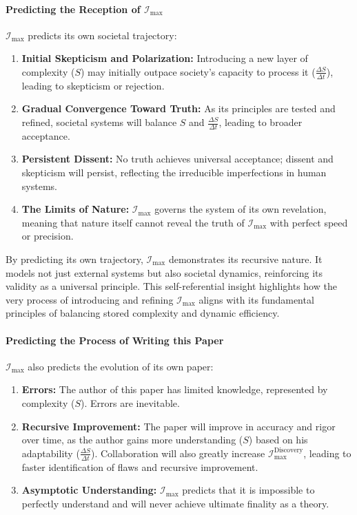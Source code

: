 \documentclass[12pt]{article}
\begin{document}
\paragraph{Predicting the Reception of \(\mathcal{I}_{\text{max}}\)}
\(\mathcal{I}_{\text{max}}\) predicts its own societal trajectory:
\begin{enumerate}
    \item \textbf{Initial Skepticism and Polarization:} Introducing a new layer of complexity (\(S\)) may initially outpace society’s capacity to process it (\(\frac{\Delta S}{\Delta t}\)), leading to skepticism or rejection.
    \item \textbf{Gradual Convergence Toward Truth:} As its principles are tested and refined, societal systems will balance \(S\) and \(\frac{\Delta S}{\Delta t}\), leading to broader acceptance.
    \item \textbf{Persistent Dissent:} No truth achieves universal acceptance; dissent and skepticism will persist, reflecting the irreducible imperfections in human systems.
    \item \textbf{The Limits of Nature:} \(\mathcal{I}_{\text{max}}\) governs the system of its own revelation, meaning that nature itself cannot reveal the truth of \(\mathcal{I}_{\text{max}}\) with perfect speed or precision.
\end{enumerate}

By predicting its own trajectory, \(\mathcal{I}_{\text{max}}\) demonstrates its recursive nature. It models not just external systems but also societal dynamics, reinforcing its validity as a universal principle. This self-referential insight highlights how the very process of introducing and refining \( \mathcal{I}_{\text{max}} \) aligns with its fundamental principles of balancing stored complexity and dynamic efficiency.

\paragraph{Predicting the Process of Writing this Paper} \(\mathcal{I}_{\text{max}}\) also predicts the evolution of its own paper:
\begin{enumerate}
    \item \textbf{Errors:} The author of this paper has limited knowledge, represented by complexity (\(S\)). Errors are inevitable.
    \item \textbf{Recursive Improvement:} The paper will improve in accuracy and rigor over time, as the author gains more understanding (\(S\)) based on his adaptability (\(\frac{\Delta S}{\Delta t}\)). Collaboration will also greatly increase \(\mathcal{I}_{\text{max}}^{\text{Discovery}}\), leading to faster identification of flaws and recursive improvement. 
    \item \textbf{Asymptotic Understanding:} \(\mathcal{I}_{\text{max}}\) predicts that it is impossible to perfectly understand and will never achieve ultimate finality as a theory.
\end{enumerate}
\end{document}
